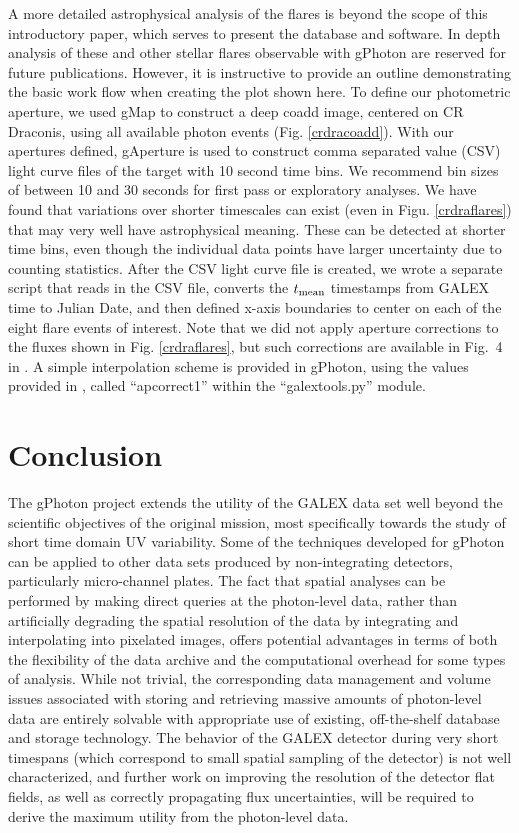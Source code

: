 \documentclass[preprint]{aastex}
\begin{document}
A more detailed astrophysical analysis of the flares is beyond the scope of this introductory paper, which serves to present the database and software. In depth analysis of these and other stellar flares observable with gPhoton are reserved for future publications. However, it is instructive to provide an outline demonstrating the basic work flow when creating the plot shown here. To define our photometric aperture, we used gMap to construct a deep coadd image, centered on CR Draconis, using all available photon events (Fig. \ref{crdracoadd}). With our apertures defined, gAperture is used to construct comma separated value (CSV) light curve files of the target with 10 second time bins. We recommend bin sizes of between 10 and 30 seconds for first pass or exploratory analyses. We have found that variations over shorter timescales can exist (even in Figu. \ref{crdraflares}) that may very well have astrophysical meaning. These can be detected at shorter time bins, even though the individual data points have larger uncertainty due to counting statistics. After the CSV light curve file is created, we wrote a separate script that reads in the CSV file, converts the $t_{\rm{mean}}$ timestamps from GALEX time to Julian Date, and then defined x-axis boundaries to center on each of the eight flare events of interest. Note that we did not apply aperture corrections to the fluxes shown in Fig. \ref{crdraflares}, but such corrections are available in Fig.\ 4 in \citet{mor2007}. A simple interpolation scheme is provided in gPhoton, using the values provided in \cite{mor2007}, called ``apcorrect1'' within the ``galextools.py'' module.

\section{Conclusion}
The gPhoton project extends the utility of the GALEX data set well beyond the scientific objectives of the original mission, most specifically towards the study of short time domain UV variability. Some of the techniques developed for gPhoton can be applied to other data sets produced by non-integrating detectors, particularly micro-channel plates. The fact that spatial analyses can be performed by making direct queries at the photon-level data, rather than artificially degrading the spatial resolution of the data by integrating and interpolating into pixelated images, offers potential advantages in terms of both the flexibility of the data archive and the computational overhead for some types of analysis. While not trivial, the corresponding data management and volume issues associated with storing and retrieving massive amounts of photon-level data are entirely solvable with appropriate use of existing, off-the-shelf database and storage technology. The behavior of the GALEX detector during very short timespans (which correspond to small spatial sampling of the detector) is not well characterized, and further work on improving the resolution of the detector flat fields, as well as correctly propagating flux uncertainties, will be required to derive the maximum utility from the photon-level data.
\end{document}
